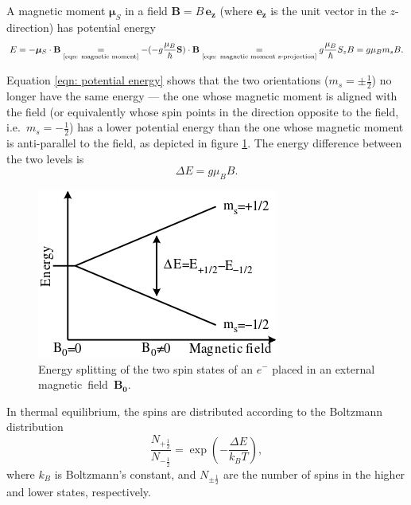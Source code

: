 \documentclass[a4paper]{jpconf}
\numberwithin{equation}{section}
\begin{document}
A magnetic moment $\bm{\mu}_S$ in a field $\mathbf{B} = B \, \mathbf{e_z}$ (where $\mathbf{e_z}$ is the unit vector in the $z$-direction) has potential energy
\begin{equation}
	E = - \bm{\mu}_S \cdot \mathbf{B} \underset{\text{\eqref{eqn: magnetic moment}}}{=}  - (- g \frac{\mu_B}{\hbar} \mathbf{S})\cdot\mathbf{B}
	  \underset{\text{\eqref{eqn: magnetic moment z-projection}}}{=} g \frac{\mu_B}{\hbar}S_z B 
	  = g\mu_Bm_sB \label{eqn: potential energy}.
\end{equation}

Equation \eqref{eqn: potential energy} shows that the two orientations ($m_s = \pm\tfrac12$) no longer have the same energy --- the one whose magnetic moment is aligned with the field (or equivalently whose spin points in the direction opposite to the field, i.e.\ $m_s = -\tfrac12$) has a lower potential energy than the one whose magnetic moment is anti-parallel to the field, as depicted in figure \ref{fig: energy splitting}. The energy difference between the two levels is 
\begin{equation}
	\Delta E = g \mu_B B. \label{eqn: energy difference}
\end{equation}

\begin{figure}[htbp]
	\includegraphics[scale=0.75]{EPR_splitting.png}
	\hspace{2pc}
	\begin{minipage}[b]{3in}
		\caption{Energy splitting of the two spin states of an $e^-$ placed in an external magnetic~field~$\mathbf{B_0}$.}
	\end{minipage}
	\label{fig: energy splitting}
\end{figure}

In thermal equilibrium, the spins are distributed according to the Boltzmann distribution
\[
    \frac{N_{+\tfrac12}}{N_{-\tfrac12}} = \exp(- \frac{\Delta E}{k_B T}),
\]
where $k_B$ is Boltzmann\textquoteright s constant, and $N_{\pm\tfrac12}$ are the number of spins in the higher and lower states, respectively. 
\end{document}
